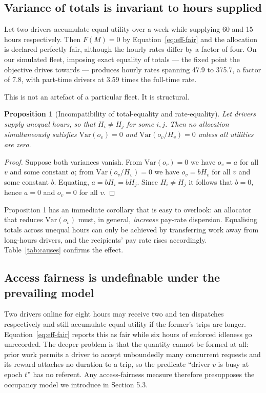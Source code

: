\documentclass[10pt,twocolumn]{article}
\newtheorem{proposition}{Proposition}
\begin{document}
\subsection{Variance of totals is invariant to hours supplied}
Let two drivers accumulate equal utility over a week while supplying 60 and 15 hours respectively. Then \(F(M)=0\) by Equation~\ref{eq:eff-fair} and the allocation is declared perfectly fair, although the hourly rates differ by a factor of four. On our simulated fleet, imposing exact equality of totals --- the fixed point the objective drives towards --- produces hourly rates spanning 47.9 to 375.7, a factor of 7.8, with part-time drivers at 3.59 times the full-time rate.

This is not an artefact of a particular fleet. It is structural.

\begin{proposition}[Incompatibility of total-equality and rate-equality]
Let drivers supply unequal hours, so that \(H_i \neq H_j\) for some \(i,j\). Then no allocation simultaneously satisfies \(\mathrm{Var}(o_v)=0\) and \(\mathrm{Var}(o_v/H_v)=0\) unless all utilities are zero.
\end{proposition}
\begin{proof}
Suppose both variances vanish. From \(\mathrm{Var}(o_v)=0\) we have \(o_v = a\) for all \(v\) and some constant \(a\); from \(\mathrm{Var}(o_v/H_v)=0\) we have \(o_v = b H_v\) for all \(v\) and some constant \(b\). Equating, \(a = b H_i = b H_j\). Since \(H_i \neq H_j\) it follows that \(b = 0\), hence \(a = 0\) and \(o_v = 0\) for all \(v\).
\end{proof}
Proposition 1 has an immediate corollary that is easy to overlook: an allocator that reduces \(\mathrm{Var}(o_v)\) must, in general, \emph{increase} pay-rate dispersion. Equalising totals across unequal hours can only be achieved by transferring work away from long-hours drivers, and the recipients' pay rate rises accordingly. Table~\ref{tab:causes} confirms the effect.

\subsection{Access fairness is undefinable under the prevailing model}
Two drivers online for eight hours may receive two and ten dispatches respectively and still accumulate equal utility if the former's trips are longer. Equation~\ref{eq:eff-fair} reports this as fair while six hours of enforced idleness go unrecorded. The deeper problem is that the quantity cannot be formed at all: prior work permits a driver to accept unboundedly many concurrent requests and its reward attaches no duration to a trip, so the predicate ``driver \(v\) is busy at epoch \(t\)'' has no referent. Any access-fairness measure therefore presupposes the occupancy model we introduce in Section 5.3.
\end{document}
